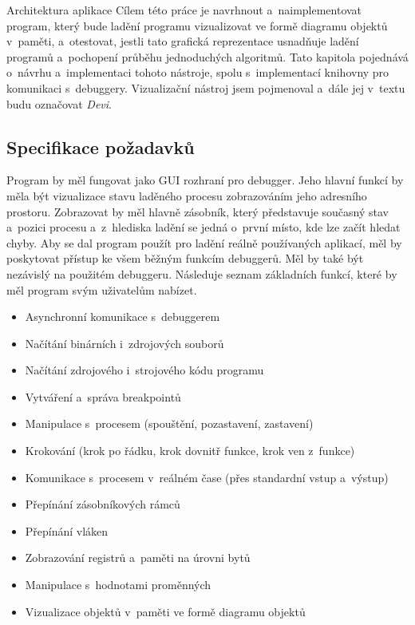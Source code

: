 \documentclass[czech,bachelor,male,python,dept460,hidelinks]{diploma}						%
\begin{document}
\begin{section}{Architektura aplikace}
\label{sec:DeviImplementation}
  Cílem této práce je navrhnout a~naimplementovat program, který bude ladění programu vizualizovat ve formě diagramu objektů v~paměti, a~otestovat,
	jestli tato grafická reprezentace usnadňuje ladění programů a~pochopení průběhu jednoduchých algoritmů.
	Tato kapitola pojednává o~návrhu a~implementaci tohoto nástroje, spolu s~implementací knihovny pro komunikaci s~debuggery.
	Vizualizační nástroj jsem pojmenoval a~dále jej v~textu budu označovat \textit{Devi}.
	
	\subsection{Specifikace požadavků}
	Program by měl fungovat jako GUI rozhraní pro debugger. Jeho hlavní funkcí by měla být vizualizace stavu laděného procesu zobrazováním jeho
	adresního prostoru. Zobrazovat by měl hlavně zásobník, který představuje současný stav a~pozici procesu a~z~hlediska ladění se jedná o~první místo,
	kde lze začít hledat chyby.
	Aby se dal program použít pro ladění reálně používaných aplikací, měl by poskytovat přístup ke všem běžným
	funkcím debuggerů. Měl by také být nezávislý na použitém debuggeru. Následuje seznam základních funkcí, které by měl program svým uživatelům nabízet.
	
	\begin{itemize}
		\item Asynchronní komunikace s~debuggerem
		\item Načítání binárních i~zdrojových souborů
		\item Načítání zdrojového i~strojového kódu programu
		\item Vytváření a~správa breakpointů
		\item Manipulace s~procesem (spouštění, pozastavení, zastavení)
		\item Krokování (krok po řádku, krok dovnitř funkce, krok ven z~funkce)
		\item Komunikace s~procesem v~reálném čase (přes standardní vstup a~výstup)
		\item Přepínání zásobníkových rámců
		\item Přepínání vláken
		\item Zobrazování registrů a~paměti na úrovni bytů
		\item Manipulace s~hodnotami proměnných
		\item Vizualizace objektů v~paměti ve formě diagramu objektů
	\end{itemize}
	

\end{section}
\end{document}
